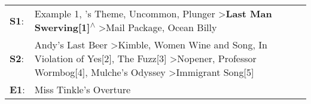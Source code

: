\begin{supertabular}{p{0.03\textwidth}p{0.92\textwidth}}
 \textbf{S1}:  &                                                                                                                Example 1\textsuperscript{}, 's Theme\textsuperscript{}, \enspace Uncommon\textsuperscript{}, \enspace Plunger\textsuperscript{} \textgreater \enspace \textbf{Last Man Swerving[1]\textsuperscript{$\wedge$}} \textgreater \enspace Mail Package\textsuperscript{}, \enspace Ocean Billy\textsuperscript{}  \enspace  \\
 \textbf{S2}:  &  Andy's Last Beer\textsuperscript{} \textgreater \enspace Kimble\textsuperscript{}, \enspace Women Wine and Song\textsuperscript{}, \enspace In Violation of Yes[2]\textsuperscript{}, \enspace The Fuzz[3]\textsuperscript{} \textgreater \enspace Nopener\textsuperscript{}, \enspace Professor Wormbog[4]\textsuperscript{}, \enspace Mulche's Odyssey\textsuperscript{} \textgreater \enspace Immigrant Song[5]\textsuperscript{}  \enspace  \\
 \textbf{E1}:  &                                                                                                                                                                                                                                                                                                                                                                                              Miss Tinkle's Overture\textsuperscript{}  \enspace  \\
\end{supertabular}
